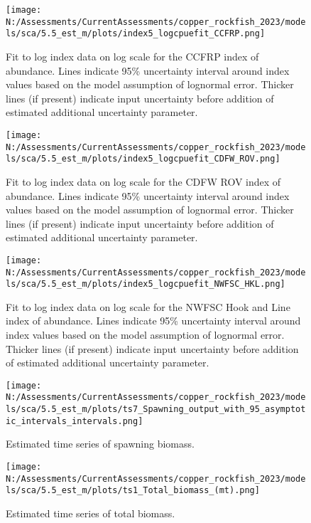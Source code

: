 \documentclass[11pt,
  english,
  letterpaper,
]{article}
\begin{document}
\begin{figure}
\centering
\texttt{[image: N:/Assessments/CurrentAssessments/copper\_rockfish\_2023/models/sca/5.5\_est\_m/plots/index5\_logcpuefit\_CCFRP.png]}
\caption{Fit to log index data on log scale for the CCFRP index of abundance. Lines indicate 95\% uncertainty interval around index values based on the model assumption of lognormal error. Thicker lines (if present) indicate input uncertainty before addition of estimated additional uncertainty parameter.\label{fig:ccfrp-index-fit}}
\end{figure}

\begin{figure}
\centering
\texttt{[image: N:/Assessments/CurrentAssessments/copper\_rockfish\_2023/models/sca/5.5\_est\_m/plots/index5\_logcpuefit\_CDFW\_ROV.png]}
\caption{Fit to log index data on log scale for the CDFW ROV index of abundance. Lines indicate 95\% uncertainty interval around index values based on the model assumption of lognormal error. Thicker lines (if present) indicate input uncertainty before addition of estimated additional uncertainty parameter.\label{fig:rov-index-fit}}
\end{figure}

\begin{figure}
\centering
\texttt{[image: N:/Assessments/CurrentAssessments/copper\_rockfish\_2023/models/sca/5.5\_est\_m/plots/index5\_logcpuefit\_NWFSC\_HKL.png]}
\caption{Fit to log index data on log scale for the NWFSC Hook and Line index of abundance. Lines indicate 95\% uncertainty interval around index values based on the model assumption of lognormal error. Thicker lines (if present) indicate input uncertainty before addition of estimated additional uncertainty parameter.\label{fig:nwfsc-hkl-index-fit}}
\end{figure}

\begin{figure}
\centering
\texttt{[image: N:/Assessments/CurrentAssessments/copper\_rockfish\_2023/models/sca/5.5\_est\_m/plots/ts7\_Spawning\_output\_with\_95\_asymptotic\_intervals\_intervals.png]}
\caption{Estimated time series of spawning biomass.\label{fig:ssb}}
\end{figure}

\begin{figure}
\centering
\texttt{[image: N:/Assessments/CurrentAssessments/copper\_rockfish\_2023/models/sca/5.5\_est\_m/plots/ts1\_Total\_biomass\_(mt).png]}
\caption{Estimated time series of total biomass.\label{fig:tot-bio}}
\end{figure}
\end{document}
